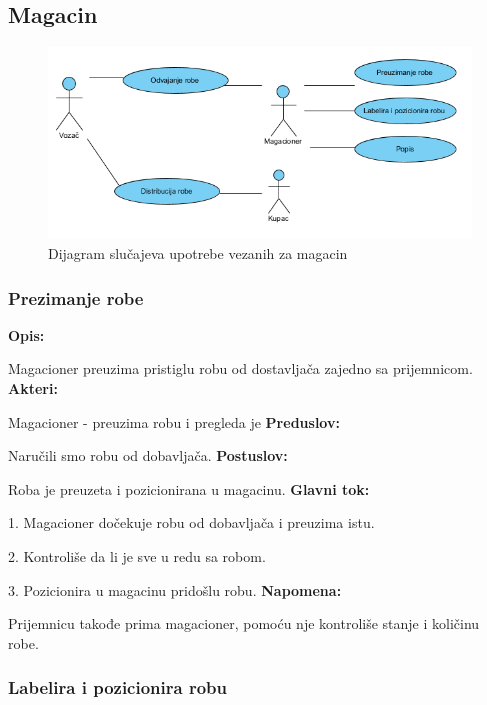\subsection{Magacin}

\begin{figure}[ht]
\centering
\includegraphics[width=140mm]{slike/useCaseMagacin.png}
\caption{Dijagram slučajeva upotrebe vezanih za magacin}
\end{figure}

\subsubsection{Prezimanje robe}

\textbf{Opis:}

Magacioner preuzima pristiglu robu od dostavljača zajedno sa prijemnicom.
\newline
\textbf{Akteri:}

Magacioner - preuzima robu i pregleda je
\newline
\textbf{Preduslov:}

Naručili smo robu od dobavljača.
\newline
\textbf{Postuslov:}

Roba je preuzeta i pozicionirana u magacinu.
\newline
\textbf{Glavni tok:}

1. Magacioner dočekuje robu od dobavljača i preuzima istu.

2. Kontroliše da li je sve u redu sa robom.

3. Pozicionira u magacinu pridošlu robu.
\newline
\textbf{Napomena:}

Prijemnicu takođe prima magacioner, pomoću nje kontroliše stanje i količinu robe.

\clearpage

\subsubsection{Labelira i pozicionira robu}

